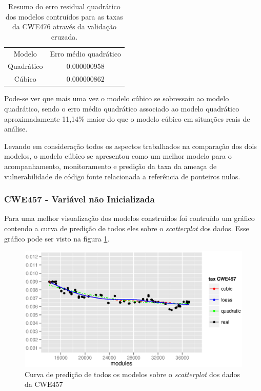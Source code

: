 \begin{table}[h]
 \centering
 \begin{tabular}{cc}
  \rowcolor[HTML]{EFEFEF} 
  {Modelo} & {Erro médio quadrático} \\
  Quadrático   & 0.000000958                  \\
  Cúbico       & 0.000000862                 
 \end{tabular}
 \caption{Resumo do erro residual quadrático dos modelos contruídos para as taxas da
 CWE476 através da validação cruzada.}
 \label{tab:cwe476-erros}
\end{table}

Pode-se ver que mais uma vez o modelo cúbico se sobressaiu ao modelo quadrático,
sendo o erro médio quadrático associado ao modelo quadrático aproximadamente
11,14\% maior do que o modelo cúbico em situações reais de análise.

Levando em consideração todos os aspectos trabalhados na comparação dos dois
modelos, o modelo cúbico se apresentou como um melhor modelo para o
acompanhamento, monitoramento e predição da taxa da ameaça de vulnerabilidade de
código fonte relacionada a referência de ponteiros nulos.

\subsubsection{CWE457 - Variável não Inicializada}

Para uma melhor visualização dos modelos construídos foi contruído um gráfico
contendo a curva de predição de todos eles sobre o \textit{scatterplot} dos
dados. Esse gráfico pode ser visto na figura \ref{fig:cwe457-all-models}.

\begin{figure}[h]
  \centering
  \includegraphics[width=1.0\textwidth]
      {figuras/cwe457-all-models.eps}
      \caption{Curva de predição de todos os modelos sobre o \textit{scatterplot}
      dos dados da CWE457}
  \label{fig:cwe457-all-models}
\end{figure}

